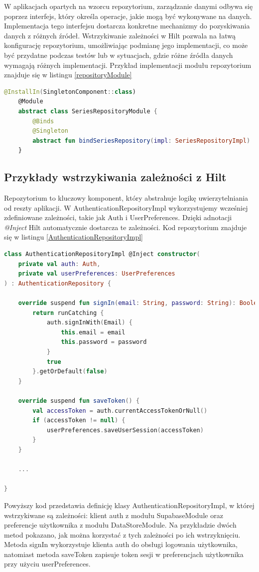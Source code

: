 \documentclass[12pt,twoside]{article}
\begin{document}
W aplikacjach opartych na wzorcu repozytorium, zarządzanie danymi odbywa się poprzez interfejs, który określa 
operacje, jakie mogą być wykonywane na danych. Implementacja tego interfejsu dostarcza konkretne mechanizmy do 
pozyskiwania danych z różnych źródeł. Wstrzykiwanie zależności w Hilt pozwala na łatwą konfigurację repozytorium, 
umożliwiając podmianę jego implementacji, co może być przydatne podczas testów lub w sytuacjach, gdzie różne źródła 
danych wymagają różnych implementacji. Przykład implementacji modułu repozytorium znajduje się w listingu 
\ref{repositoryModule}

\begin{lstlisting}[language=Kotlin,caption=Przykład modułu repozytorium SeriesRepository, label={repositoryModule}]
	@InstallIn(SingletonComponent::class)
	@Module
	abstract class SeriesRepositoryModule {
		@Binds
		@Singleton
		abstract fun bindSeriesRepository(impl: SeriesRepositoryImpl) : SeriesRepository
	}
\end{lstlisting}

\subsection{Przykłady wstrzykiwania zależności z Hilt}

Repozytorium to kluczowy komponent, który abstrahuje logikę uwierzytelniania od reszty aplikacji. W 
AuthenticationRepositoryImpl wykorzystujemy wcześniej zdefiniowane zależności, takie jak Auth i UserPreferences. 
Dzięki adnotacji \textit{@Inject} Hilt automatycznie dostarcza te zależności. Kod repozytorium znajduje się w listingu 
\ref{AuthenticationRepositoryImpl}

\begin{lstlisting}[language=Kotlin,caption=Implementacja AuthenticationRepository, label={AuthenticationRepositoryImpl}]
	class AuthenticationRepositoryImpl @Inject constructor(
    private val auth: Auth,
    private val userPreferences: UserPreferences
) : AuthenticationRepository {

    override suspend fun signIn(email: String, password: String): Boolean {
        return runCatching {
            auth.signInWith(Email) {
                this.email = email
                this.password = password
            }
            true
        }.getOrDefault(false)
    }

	override suspend fun saveToken() {
        val accessToken = auth.currentAccessTokenOrNull()
        if (accessToken != null) {
            userPreferences.saveUserSession(accessToken)
        }
    }

	...

}
\end{lstlisting}
Powyższy kod przedstawia definicję klasy AuthenticationRepositoryImpl, w której wstrzykiwane są zależności: klient 
auth z modułu SupabaseModule oraz preferencje użytkownika z modułu DataStoreModule. Na przykładzie dwóch metod 
pokazano, jak można korzystać z tych zależności po ich wstrzyknięciu. Metoda signIn wykorzystuje klienta auth do 
obsługi logowania użytkownika, natomiast metoda saveToken zapisuje token sesji w preferencjach użytkownika przy 
użyciu userPreferences.
\end{document}
